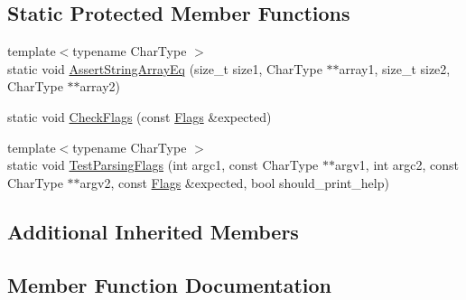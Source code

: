 \subsection*{Static Protected Member Functions}
\begin{DoxyCompactItemize}
\item 
{\footnotesize template$<$typename Char\+Type $>$ }\\static void \hyperlink{classtesting_1_1InitGoogleTestTest_af32acd91b1185c6868072009dce55a7b}{Assert\+String\+Array\+Eq} (size\+\_\+t size1, Char\+Type $\ast$$\ast$array1, size\+\_\+t size2, Char\+Type $\ast$$\ast$array2)
\item 
static void \hyperlink{classtesting_1_1InitGoogleTestTest_aac37d5d592202bf6614b02fe0b4da9d2}{Check\+Flags} (const \hyperlink{structtesting_1_1Flags}{Flags} \&expected)
\item 
{\footnotesize template$<$typename Char\+Type $>$ }\\static void \hyperlink{classtesting_1_1InitGoogleTestTest_add290338cf429308d0ab275ae4c46e69}{Test\+Parsing\+Flags} (int argc1, const Char\+Type $\ast$$\ast$argv1, int argc2, const Char\+Type $\ast$$\ast$argv2, const \hyperlink{structtesting_1_1Flags}{Flags} \&expected, bool should\+\_\+print\+\_\+help)
\end{DoxyCompactItemize}
\subsection*{Additional Inherited Members}


\subsection{Member Function Documentation}

